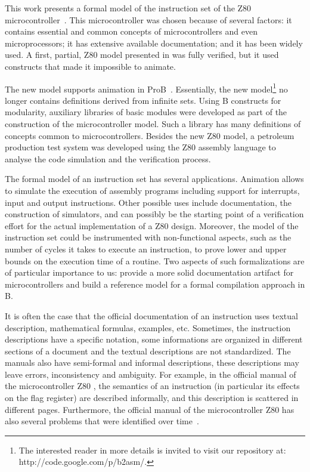 \documentclass[a4paper]{llncs}
\begin{document}
This work presents a formal model of the instruction set of the Z80
microcontroller~\cite{Z80_manual}. This microcontroller was chosen
because of several factors: it contains essential and common concepts
of microcontrollers and even microprocessors; it has extensive
available documentation; and it has been widely used.  A first,
partial, Z80 model presented in \cite{Valerio_SBMF09} was fully
verified, but it used constructs that made it impossible to animate.

The new model supports animation in ProB~\cite{proB}.  Essentially, the
new model\footnote{The interested reader in more details is invited to
  visit our repository at: http://code.google.com/p/b2asm/.}  no
longer contains definitions derived from infinite sets. Using B
constructs for modularity, auxiliary libraries of basic modules were
developed as part of the construction of the microcontroller model. Such
a library has many definitions of concepts common to microcontrollers.
Besides the new Z80 model, a petroleum production test system was
developed using the Z80 assembly language to analyse the code simulation
and the verification process.

The formal model of an instruction set has several
applications. Animation allows to simulate the execution of assembly
programs including support for interrupts, input and output
instructions. Other possible uses include documentation, the
construction of simulators, and can possibly be the starting point of
a verification effort for the actual implementation of a Z80
design. Moreover, the model of the instruction set could be
instrumented with non-functional aspects, such as the number of cycles
it takes to execute an instruction, to prove lower and upper bounds on
the execution time of a routine.  Two aspects of such formalizations
are of particular importance to us: provide a more solid documentation
artifact for microcontrollers and build a reference model for a formal
compilation approach in B.

It is often the case that the official documentation of an instruction
uses textual description, mathematical formulas, examples,
etc. Sometimes, the instruction descriptions have a specific notation,
some informations are organized in different sections of a document and
the textual descriptions are not standardized.  The manuals also have
semi-formal and informal descriptions, these descriptions may leave
errors, inconsistency and ambiguity.  For example, in the official
manual of the microcontroller Z80 \cite{Z80_manual}, the semantics of
an instruction (in particular its effects on the flag register) are
described informally, and this description is scattered in
different pages.  Furthermore, the official manual of the
microcontroller Z80 has also several problems that were identified
over time~\cite{UndocumentedZ80}.
\end{document}

